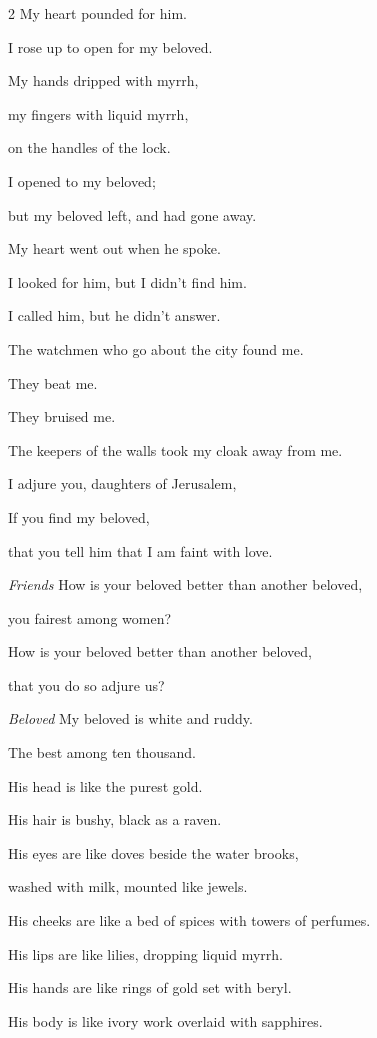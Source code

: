 \begin{multicols}{2}
My heart pounded for him.

\myverse{}I rose up to open for my beloved.

My hands dripped with myrrh,

my fingers with liquid myrrh,

on the handles of the lock.

\myverse{}I opened to my beloved;

but my beloved left, and had gone away.

My heart went out when he spoke.

I looked for him, but I didn’t find him.

I called him, but he didn’t answer.

\myverse{}The watchmen who go about the city found me.

They beat me.

They bruised me.

The keepers of the walls took my cloak away from me.


\vspace{\baselineskip} \myverse{}I adjure you, daughters of Jerusalem,

If you find my beloved,

that you tell him that I am faint with love.


\textit{Friends}
\myverse{}How is your beloved better than another beloved,

you fairest among women?

How is your beloved better than another beloved,

that you do so adjure us?


\textit{Beloved}
\myverse{}My beloved is white and ruddy.

The best among ten thousand.

\myverse{}His head is like the purest gold.

His hair is bushy, black as a raven.

\myverse{}His eyes are like doves beside the water brooks,

washed with milk, mounted like jewels.

\myverse{}His cheeks are like a bed of spices with towers of perfumes.

His lips are like lilies, dropping liquid myrrh.

\myverse{}His hands are like rings of gold set with beryl.

His body is like ivory work overlaid with sapphires.


\end{multicols}
